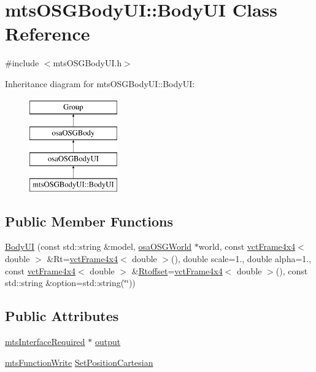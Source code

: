 \hypertarget{classmts_o_s_g_body_u_i_1_1_body_u_i}{\section{mts\-O\-S\-G\-Body\-U\-I\-:\-:Body\-U\-I Class Reference}
\label{classmts_o_s_g_body_u_i_1_1_body_u_i}
}


{\ttfamily \#include $<$mts\-O\-S\-G\-Body\-U\-I.\-h$>$}

Inheritance diagram for mts\-O\-S\-G\-Body\-U\-I\-:\-:Body\-U\-I\-:\begin{figure}[H]
\begin{center}
\leavevmode
\includegraphics[height=4.000000cm]{de/d40/classmts_o_s_g_body_u_i_1_1_body_u_i}
\end{center}
\end{figure}
\subsection*{Public Member Functions}
\begin{DoxyCompactItemize}
\item 
\hyperlink{classmts_o_s_g_body_u_i_1_1_body_u_i_a6187120fd48eadf45655cf830edb380e}{Body\-U\-I} (const std\-::string \&model, \hyperlink{classosa_o_s_g_world}{osa\-O\-S\-G\-World} $\ast$world, const \hyperlink{classvct_frame4x4}{vct\-Frame4x4}$<$ double $>$ \&Rt=\hyperlink{classvct_frame4x4}{vct\-Frame4x4}$<$ double $>$(), double scale=1., double alpha=1., const \hyperlink{classvct_frame4x4}{vct\-Frame4x4}$<$ double $>$ \&\hyperlink{classosa_o_s_g_body_ad008984bdb0eda300948932eda13974a}{Rtoffset}=\hyperlink{classvct_frame4x4}{vct\-Frame4x4}$<$ double $>$(), const std\-::string \&option=std\-::string(\char`\"{}\char`\"{}))
\end{DoxyCompactItemize}
\subsection*{Public Attributes}
\begin{DoxyCompactItemize}
\item 
\hyperlink{classmts_interface_required}{mts\-Interface\-Required} $\ast$ \hyperlink{classmts_o_s_g_body_u_i_1_1_body_u_i_a6f097314200b0f73b3fd377c7d4a2ed4}{output}
\item 
\hyperlink{classmts_function_write}{mts\-Function\-Write} \hyperlink{classmts_o_s_g_body_u_i_1_1_body_u_i_a60f80540e054d34498cfc08945cd512e}{Set\-Position\-Cartesian}
\end{DoxyCompactItemize}
